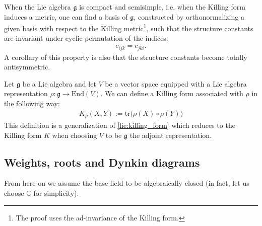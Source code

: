     \begin{property}
        When the Lie algebra $\mathfrak{g}$ is compact and semisimple, i.e. when the Killing form induces a metric, one can find a basis of $\mathfrak{g}$, constructed by orthonormalizing a given basis with respect to the Killing metric\footnote{The proof uses the ad-invariance of the Killing form.}, such that the structure constants are invariant under cyclic permutation of the indices:
        \begin{gather}
            c_{ijk} = c_{jki}.
        \end{gather}
        A corollary of this property is also that the structure constants become totally antisymmetric.
    \end{property}

    \begin{construct}
        Let $\mathfrak{g}$ be a Lie algebra and let $V$ be a vector space equipped with a Lie algebra representation $\rho:\mathfrak{g}\rightarrow\text{End}(V)$. We can define a Killing form associated with $\rho$ in the following way:
        \begin{gather}
            \label{lie:rho_killing_form}
            K_\rho(X,Y) := \text{tr}\big(\rho(X)\circ\rho(Y)\big)
        \end{gather}
        This definition is a generalization of \ref{lie:killing_form} which reduces to the Killing form $K$ when choosing $V$ to be $\mathfrak{g}$ the adjoint representation.
    \end{construct}

\subsection{Weights, roots and Dynkin diagrams}

    From here on we assume the base field to be algebraically closed (in fact, let us choose $\mathbb{C}$ for simplicity).



